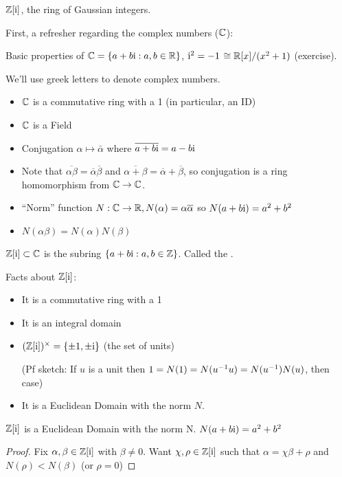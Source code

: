 \documentclass[notes.tex]{subfiles}
\begin{document}
\begin{digression}
	$\mathbb{Z}[\mathrm{i}]$, the ring of Gaussian integers. 

	First, a refresher regarding the complex numbers ($\mathbb{C}$):
	\begin{tabin}
		Basic properties of $\mathbb{C} = \{a + b\mathrm{i}: a,b\in\mathbb{R}\}$, $\mathrm{i}^2=-1$
		$\cong \mathbb{R}[x]/(x^2+1)$ (exercise).

		We'll use greek letters to denote complex numbers.
		\begin{itemize}
			\item $\mathbb{C}$ is a commutative ring with a 1 (in particular, an ID)
			\item $\mathbb{C}$ is a Field 
			\item Conjugation $\alpha\mapsto \bar\alpha$ where $\overline{a+b\mathrm{i}} = a-b\mathrm{i}$
			\item Note that $\overline{\alpha \beta} = \overline \alpha\overline \beta$ and $\overline{\alpha+\beta} = \overline{\alpha} + \overline{\beta}$, so conjugation is a ring homomorphism from $\mathbb{C}\to\mathbb{C}$.
			\item ``Norm'' function $N:\mathbb{C}\to\mathbb{R}, N(\alpha)=\alpha\overline\alpha$ so $N(a+b\mathrm{i}) = a^2 + b^2$
			\item $N(\alpha \beta) = N(\alpha)N(\beta)$
		\end{itemize}
	\end{tabin}

	\begin{defn}
		$\mathbb{Z}[\mathrm{i}]\subset\mathbb{C}$ is the subring $\{a+b\mathrm{i}:a,b\in\mathbb{Z}\}$.
		Called the .
	\end{defn}
	Facts about $\mathbb{Z}[\mathrm{i}]$:
	\begin{itemize}
		\item It is a commutative ring with a 1
		\item It is an integral domain
		\item $(\mathbb{Z}[\mathrm{i}])^\times = \{\pm1, \pm\mathrm{i}\}$ (the set of units)

			(Pf sketch: If $u$ is a unit then $1 = N(1) = N({u}^{-1}u) = N({u}^{-1})N(u)$, then case)
		\item It is a Euclidean Domain with the norm $N$.
	\end{itemize}
	\begin{proposition}
		$\mathbb{Z}[\mathrm{i}]$ is a Euclidean Domain with the norm N. $N(a+b\mathrm{i}) = a^2+b^2$
	\end{proposition}
	\begin{proof}
		Fix $\alpha,\beta\in \mathbb{Z}[\mathrm{i}]$ with $\beta\ne 0$. Want $\chi, \rho\in\mathbb{Z}[\mathrm{i}]$ such that $\alpha=\chi \beta + \rho$ and $N(\rho) < N(\beta)$ (or $\rho=0$)


\end{proof}
\end{digression}
\end{document}
